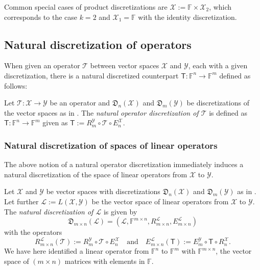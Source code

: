 \documentclass[a4paper]{paper}
\newcommand{\Discr}{\mathfrak{D}}
\newcommand{\Spc}[1]{\mathscr{#1}}
\newcommand{\Field}{\mathbb{F}}
\newcommand{\Op}[1]{\mathcal{#1}}
\newcommand{\DiscOp}[1]{\mathsf{#1}}
\newcommand*{\EXT}[2]{\ensuremath{E_{#1}^{#2}}}
\newcommand*{\REST}[2]{\ensuremath{R_{#1}^{#2}}}
\newcommand*{\RnX}{\ensuremath{\REST{n}{\Spc{X}}}}
\newcommand*{\RmY}{\ensuremath{\REST{m}{\Spc{Y}}}}
\newcommand*{\EnX}{\ensuremath{\EXT{n}{\Spc{X}}}}
\newcommand*{\EmY}{\ensuremath{\EXT{m}{\Spc{Y}}}}
\begin{document}
%
Common special cases of product discretizations are $\Spc{X}:=\Field \times \Spc{X}_2$, which corresponds to the case 
$k=2$ and $\Spc{X}_1=\Field$ with the identity discretization.



\subsection{Natural discretization of operators}
\label{subsec:discr:operator}

When given an operator $\Op{T}$ between vector spaces $\Spc{X}$ and $\Spc{Y}$, each with a given discretization, 
there is a natural discretized counterpart $\DiscOp{T} \colon \Field^n \to \Field^m$ defined as follows:

\begin{definition}
 \label{def:discr:operator:operator_discr}
 Let $\Op{T}\colon \Spc{X} \to \Spc{Y}$ be an operator and $\Discr_n(\Spc{X})$ and $\Discr_m(\Spc{Y})$ be 
 discretizations of the vector spaces as in . The 
 \emph{natural operator discretization of $\Op{T}$} is defined as $\DiscOp{T} \colon \Field^n \to \Field^m$ given as 
 $\DiscOp{T} := \RmY \circ \Op{T} \circ \EnX$.
\end{definition}


\subsubsection{Natural discretization of spaces of linear operators}
\label{subsubsec:discr:operator:linop_space}

The above notion of a natural operator discretization immediately induces a natural discretization of the space of 
linear operators from $\Spc{X}$ to $\Spc{Y}$.

\begin{definition}
 \label{def:discr:operator:linop_space:linop_space_discr}
 Let $\Spc{X}$ and $\Spc{Y}$ be vector spaces with discretizations $\Discr_n(\Spc{X})$ and $\Discr_m(\Spc{Y})$ 
 as in . Let further $\Spc{L} := L(\Spc{X}, \Spc{Y})$ be the 
 vector space of linear operators from $\Spc{X}$ to $\Spc{Y}$. The \emph{natural discretization of $\Spc{L}$} is 
 given by
 \begin{equation*}
  \Discr_{m\times n}(\Spc{L}) = \left( \Spc{L}, \Field^{m\times n}, \REST{m\times n}{\Spc{L}}, \EXT{m\times n}{\Spc{L}}
  \right)
 \end{equation*}
 with the operators
 \begin{equation*}
  \REST{m\times n}{\Spc{L}}(\Op{T}) := \RmY \circ \Op{T} \circ \EnX
  \quad\text{and}\quad
  \EXT{m\times n}{\Spc{L}}(\DiscOp{T}) := \EmY \circ \DiscOp{T} \circ \RnX.
 \end{equation*}
 We have here identified a linear operator from $\Field^n$ to $\Field^m$ with $\Field^{m\times n}$, the vector space 
 of $(m \times n)$ matrices with elements in $\Field$.
\end{definition}
\end{document}
